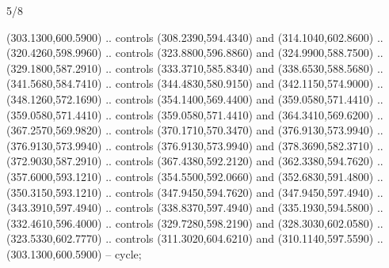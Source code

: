 \begin{flagdescription}{5/8}
\begin{scope}[shift={(m)}]
\begin{scope}[scale=\flagwidth/220,y=0.1mm, x=0.1mm, yscale=-1,shift={(-596,-360)}]
\begin{scope}[cm={{-1.0,0.0,0.0,1.0,(1193.9797,0.0)}}]
\begin{scope}[draw=black,line join=round,line cap=round,line width=0.381\lw]
\begin{scope}[line width=0.534\lw,fill=green]
 (303.1300,600.5900) .. controls (308.2390,594.4340) and
  (314.1040,602.8600) .. (320.4260,598.9960) .. controls (323.8800,596.8860) and
  (324.9900,588.7500) .. (329.1800,587.2910) .. controls (333.3710,585.8340) and
  (338.6530,588.5680) .. (341.5680,584.7410) .. controls (344.4830,580.9150) and
  (342.1150,574.9000) .. (348.1260,572.1690) .. controls (354.1400,569.4400) and
  (359.0580,571.4410) .. (359.0580,571.4410) .. controls (359.0580,571.4410) and
  (364.3410,569.6200) .. (367.2570,569.9820) .. controls (370.1710,570.3470) and
  (376.9130,573.9940) .. (376.9130,573.9940) .. controls (376.9130,573.9940) and
  (378.3690,582.3710) .. (372.9030,587.2910) .. controls (367.4380,592.2120) and
  (362.3380,594.7620) .. (357.6000,593.1210) .. controls (354.5500,592.0660) and
  (352.6830,591.4800) .. (350.3150,593.1210) .. controls (347.9450,594.7620) and
  (347.9450,597.4940) .. (343.3910,597.4940) .. controls (338.8370,597.4940) and
  (335.1930,594.5800) .. (332.4610,596.4000) .. controls (329.7280,598.2190) and
  (328.3030,602.0580) .. (323.5330,602.7770) .. controls (311.3020,604.6210) and
  (310.1140,597.5590) .. (303.1300,600.5900) -- cycle;


\end{scope}
\end{scope}
\end{scope}
\end{scope}
\end{scope}
\end{flagdescription}

